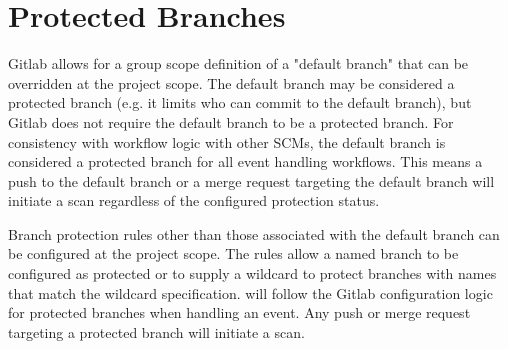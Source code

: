 \section{Protected Branches}

Gitlab allows for a group scope definition of a "default branch" that can be overridden at the
project scope.  The default branch may be considered a protected branch (e.g. it limits who can
commit to the default branch), but Gitlab does not require the default branch to be a protected
branch.  For consistency with \cxoneflow workflow logic with other SCMs, the default branch is
considered a protected branch for all event handling workflows.  This means a push to the 
default branch or a merge request targeting the default branch will initiate a scan regardless
of the configured protection status.

Branch protection rules other than those associated with the default branch can be configured at
the project scope.  The rules allow a named branch to be configured as protected or to supply
a wildcard to protect branches with names that match the wildcard specification.  \cxoneflow will
follow the Gitlab configuration logic for protected branches when handling an event.  Any push
or merge request targeting a protected branch will initiate a scan.
